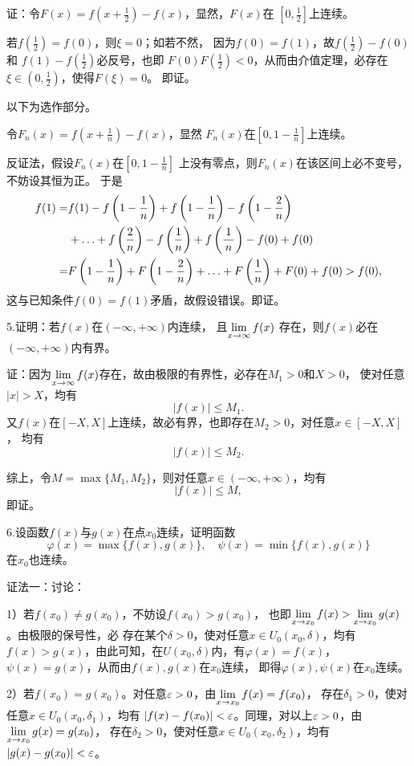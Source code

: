 证：令$F(x)=f\left(x+\frac12\right)-f(x)$，显然，$F(x)$在
$\left[0,\frac12\right]$上连续。

若$f\left(\frac12\right)=f(0)$，则$\xi=0$；如若不然，
因为$f(0)=f(1)$，故$f\left(\frac12\right)-f(0)$和
$f(1)-f\left(\frac12\right)$必反号，也即
$F(0)F\left(\frac12\right)<0$，从而由介值定理，必存在
$\xi\in\left(0,\frac12\right)$，使得$F(\xi)=0$。
即证。

以下为选作部分。

令$F_n(x)=f\left(x+\frac1n\right)-f(x)$，显然
$F_n(x)$在$\left[0,1-\frac1n\right]$上连续。

反证法，假设$F_n(x)$在$\left[0,1-\frac1n\right]$
上没有零点，则$F_n(x)$在该区间上必不变号，不妨设其恒为正。
于是
\begin{align*}
	f(1)=&f(1)-f\left(1-\frac1n\right)
	+f\left(1-\frac1n\right)-f\left(1-\frac2n\right)\\
	&+\ldots+f\left(\frac2n\right)-f\left(\frac1n\right)
	+f\left(\displaystyle\frac{\,{1}\,}{\,{n}\,}\right)-f(0)+f(0)\\
	=&F\left(1-\frac1n\right)+F\left(1-\frac2n\right)
	+\ldots+F\left(\frac1n\right)+F(0)+f(0)
	>f(0),
\end{align*}
这与已知条件$f(0)=f(1)$矛盾，故假设错误。即证。\fin

\bs
5.证明：若$f(x)$在$(-\infty,+\infty)$内连续，
且$\lim\limits_{x\to{\infty}}f(x)$
存在，则$f(x)$必在$(-\infty,+\infty)$内有界。

证：因为$\lim\limits_{x\to{\infty}}f(x)$存在，故由极限的有界性，必存在$M_1>0$和$X>0$，
使对任意$|x|>X$，均有
$$|f(x)|\leq M_1.$$
又$f(x)$在$[-X,X]$上连续，故必有界，也即存在$M_2>0$，对任意$x\in[-X,X]$，
均有
$$|f(x)|\leq M_2.$$

综上，令$M=\max\{M_1,M_2\}$，则对任意$x\in(-\infty,+\infty)$，均有
$$|f(x)|\leq M,$$
即证。\fin

\bs
6.设函数$f(x)$与$g(x)$在点$x_0$连续，证明函数
$$\varphi(x)=\max\{f(x),g(x)\},\quad
\psi(x)=\min\{f(x),g(x)\}$$
在$x_0$也连续。

证法一：讨论：

1）若$f(x_0)\ne g(x_0)$，不妨设$f(x_0)>g(x_0)$，
也即$\lim\limits_{x\to{x_0}}f(x)>\lim\limits_{x\to{x_0}}g(x)$。由极限的保号性，必
存在某个$\delta>0$，使对任意$x\in U_0(x_0,\delta)$，均有
$f(x)>g(x)$，由此可知，在$U(x_0,\delta)$内，有$\varphi(x)=f(x)$，
$\psi(x)=g(x)$，从而由$f(x),g(x)$在$x_0$连续，
即得$\varphi(x),\psi(x)$在$x_0$连续。

2）若$f(x_0)=g(x_0)$。对任意$\varepsilon>0$，由$\lim\limits_{x\to{x_0}}f(x)=f(x_0)$，
存在$\delta_1>0$，使对任意$x\in U_0(x_0,\delta_1)$，均有
$|f(x)-f(x_0)|<\varepsilon$。同理，对以上$\varepsilon>0$，由$\lim\limits_{x\to{x_0}}g(x)=g(x_0)$，
存在$\delta_2>0$，使对任意$x\in U_0(x_0,\delta_2)$，均有
$|g(x)-g(x_0)|<\varepsilon$。

